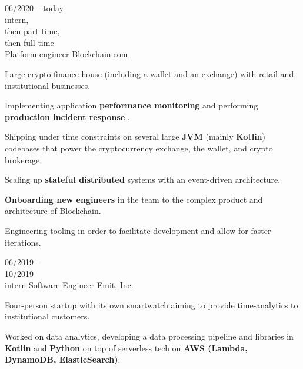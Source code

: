 \begin{entrylist}
    \entry
    {
        06/2020 -- today\\\footnotesize{intern,\\then part-time, \\then full time}\\
    }
    {Platform engineer}
    {\href{https://blockchain.com/about}{Blockchain.com}}
    {
        Large crypto finance house (including a wallet and an exchange) with retail and
    institutional businesses.

    \para
    Implementing application \textbf{performance monitoring} and performing \textbf{production incident response
    }.

    \para
    Shipping under time constraints on several large \textbf{JVM} (mainly \textbf{Kotlin}) codebases that power the
    cryptocurrency exchange, the wallet, and crypto brokerage.

    \para
    Scaling up \textbf{stateful distributed} systems with an event-driven architecture.

    \para
    \textbf{Onboarding new engineers} in the team to the complex product and architecture of Blockchain.

    \para
    Engineering tooling in order to facilitate development and allow for faster iterations.
    }
    \entry
    {06/2019 -- \\ 10/2019\\\footnotesize{intern}}
    {Software Engineer}
    {Emit, Inc.}
    {
        Four-person startup with its own smartwatch aiming to provide time-analytics to
        institutional customers.

        \para
        Worked on data analytics, developing a data processing pipeline and libraries in
    \textbf{Kotlin} and \textbf{Python} on top of serverless tech on \textbf{AWS (Lambda,
        DynamoDB, ElasticSearch)}.
    }
\end{entrylist}
